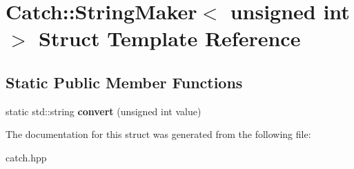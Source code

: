 \hypertarget{structCatch_1_1StringMaker_3_01unsigned_01int_01_4}{}\section{Catch\+:\+:String\+Maker$<$ unsigned int $>$ Struct Template Reference}
\label{structCatch_1_1StringMaker_3_01unsigned_01int_01_4}
\subsection*{Static Public Member Functions}
\begin{DoxyCompactItemize}
\item 
static std\+::string {\bfseries convert} (unsigned int value)\hypertarget{structCatch_1_1StringMaker_3_01unsigned_01int_01_4_aa0ec816ef8a65664b0524d55d08e2fd9}{}\label{structCatch_1_1StringMaker_3_01unsigned_01int_01_4_aa0ec816ef8a65664b0524d55d08e2fd9}

\end{DoxyCompactItemize}


The documentation for this struct was generated from the following file\+:\begin{DoxyCompactItemize}
\item 
catch.\+hpp\end{DoxyCompactItemize}
